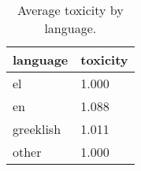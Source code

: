 \begin{table}
\caption{Average toxicity by language.}
\label{tab::toxic_lang}
\begin{tabular}{|p{3.5cm}|p{1cm}|}
\toprule
language & toxicity \\
\midrule
el & 1.000 \\
en & 1.088 \\
greeklish & 1.011 \\
other & 1.000 \\
\bottomrule
\end{tabular}
\end{table}
